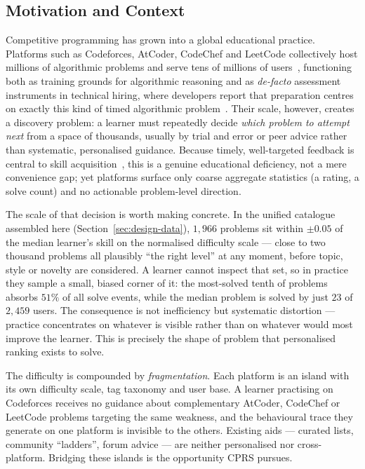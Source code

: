 \documentclass[12pt,a4paper]{article}
\begin{document}
\subsection{Motivation and Context}
Competitive programming has grown into a global educational practice. Platforms such
as Codeforces, AtCoder, CodeChef and LeetCode collectively host millions of algorithmic
problems and serve tens of millions of users~\cite{wasik2018}, functioning both as training
grounds for algorithmic reasoning and as \emph{de-facto} assessment instruments in
technical hiring, where developers report that preparation centres on exactly this kind
of timed algorithmic problem~\cite{behroozi2019}. Their scale, however, creates a discovery problem: a learner must repeatedly decide
\emph{which problem to attempt next} from a space of thousands, usually by trial and
error or peer advice rather than systematic, personalised guidance. Because timely, well-targeted feedback is central
to skill acquisition~\cite{boud2013}, this is a genuine educational deficiency, not a
mere convenience gap; yet platforms surface only coarse aggregate statistics (a rating,
a solve count) and no actionable problem-level direction.

The scale of that decision is worth making concrete. In the unified catalogue assembled
here (Section~\ref{sec:design-data}), $1{,}966$ problems sit within $\pm0.05$ of the
median learner's skill on the normalised difficulty scale --- close to two thousand
problems all plausibly ``the right level'' at any moment, before topic, style or novelty
are considered. A learner cannot inspect that set, so in practice they sample a small,
biased corner of it: the most-solved tenth of problems absorbs $51\%$ of all solve
events, while the median problem is solved by just $23$ of $2{,}459$ users. The
consequence is not inefficiency but systematic distortion --- practice concentrates on
whatever is visible rather than on whatever would most improve the learner. This is
precisely the shape of problem that personalised ranking exists to solve.

The difficulty is compounded by \emph{fragmentation}. Each platform is an island with its
own difficulty scale, tag taxonomy and user base. A learner practising on Codeforces
receives no guidance about complementary AtCoder, CodeChef or LeetCode problems targeting
the same weakness, and the behavioural trace they generate on one platform is invisible
to the others. Existing aids --- curated lists, community ``ladders'', forum advice ---
are neither personalised nor cross-platform. Bridging these islands is the opportunity
CPRS pursues.
\end{document}
